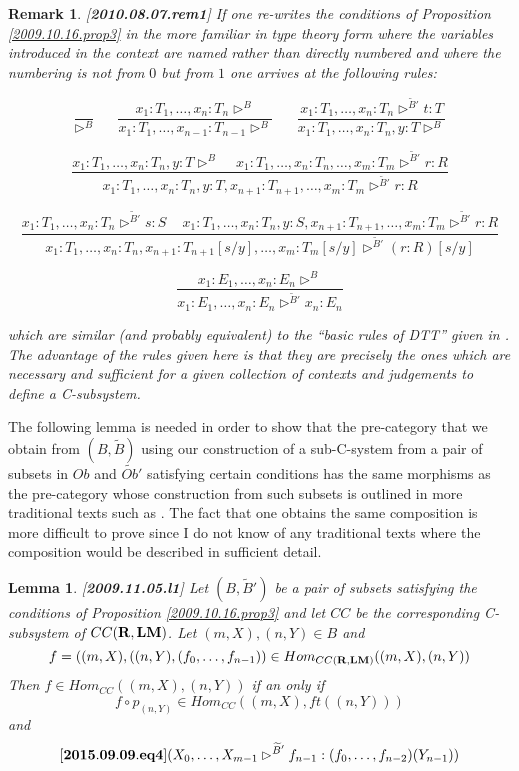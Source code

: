 \documentclass[11pt]{article}
\newenvironment{eq}{\begin{equation}}{\end{equation}}
\newtheorem{lemma}[proposition]{Lemma}
\newtheorem{remark}[proposition]{Remark}
\newcommand{\llabel}[1]{\label{#1}[{\bf #1}]}
\newcommand{\rr}{{\bf R}}
\newcommand{\lm}{{\bf LM}}
\newcommand{\wt}{\widetilde}
\begin{document}
%
\begin{remark}\rm\llabel{2010.08.07.rem1} If one re-writes the conditions of Proposition \ref{2009.10.16.prop3} in the more familiar in type theory form where the variables introduced in the context are named rather than directly numbered and where the numbering is not from $0$ but from $1$ one arrives at the following rules:
%
\begin{center}
%
$$\frac{}{\rhd^{B}}\,\,\,\,\,\,\,\,\,\,
\frac{x_1:T_1,\dots,x_n:T_n\rhd^{B}}{x_1:T_1,\dots,x_{n-1}:T_{n-1}\rhd^{B}} \,\,\,\,\,\,\,\,\,\, 
\frac{x_1:T_1,\dots,x_n:T_n\rhd^{\wt{B}'} t:T}{x_1:T_1,\dots,x_n:T_n, y:T\rhd^{B}}$$

$$\frac{x_1:T_1,\dots,x_n:T_n, y:T\rhd^{B}\,\,\,\,\,\,\,x_1:T_1,\dots,x_n:T_n,\dots, x_m:T_m\rhd^{\wt{B}'} r:R}{x_1:T_1,\dots,x_n:T_n, y:T, x_{n+1}:T_{n+1},\dots,x_m:T_m\rhd^{\wt{B}'} r:R}$$

$$\frac{x_1:T_1,\dots,x_n:T_n\rhd^{\wt{B}'} s:S\,\,\,\,\,\,\,x_1:T_1,\dots,x_n:T_n,y:S,x_{n+1}:T_{n+1},\dots,x_m:T_m\rhd^{\wt{B}'} r:R}
{x_1:T_1,\dots,x_n:T_n,x_{n+1}:T_{n+1}[s/y],\dots,x_m:T_m[s/y]\rhd^{\wt{B}'} (r:R)[s/y]}$$

$$\frac{x_1:E_1,\dots,x_n:E_n\rhd^{B}}{x_1:E_1,\dots,x_n:E_n\rhd^{\wt{B}'} x_n:E_n}$$

\end{center}
%
which are similar (and probably equivalent) to the ``basic rules of DTT'' given in \cite[p.585]{Jacobs1}. The advantage of the rules given here is that they are precisely the ones which are necessary and sufficient for a given collection of contexts and judgements to define a C-subsystem.
\end{remark}
%
The following lemma is needed in order to show that the pre-category that we obtain from $(B,\wt{B})$ using our construction of a sub-C-system from a pair of subsets in $Ob$ and $\wt{Ob}'$ satisfying certain conditions has the same morphisms as the pre-category whose construction from such subsets is outlined  in more traditional texts such as \cite{MH1995}. The fact that one obtains the same composition is more difficult to prove since I do not know of any traditional texts where the composition would be described in sufficient detail. 
%
\begin{lemma}
\llabel{2009.11.05.l1}
Let $(B,\wt{B}')$ be a pair of subsets satisfying the conditions of Proposition \ref{2009.10.16.prop3} and let $CC$ be the corresponding C-subsystem of $CC(\rr,\lm)$. Let $(m,X),(n,Y)\in B$ and 
%
$$f=((m,X),((n,Y),(f_0,\dots,f_{n-1}))\in Hom_{CC(\rr,\lm)}((m,X),(n,Y))$$
%
Then $f\in Hom_{CC}((m,X), (n,Y))$ if an only if 
%
$$f\circ p_{(n,Y)}\in Hom_{CC}((m,X), ft((n,Y)))$$
%
and 
%
\begin{eq}\llabel{2015.09.09.eq4}
(X_0,\dots,X_{m-1}\rhd^{\wt{B}'} f_{n-1} : (f_0,\dots,f_{n-2})(Y_{n-1}))
\end{eq}
%
\end{lemma}
\end{document}
